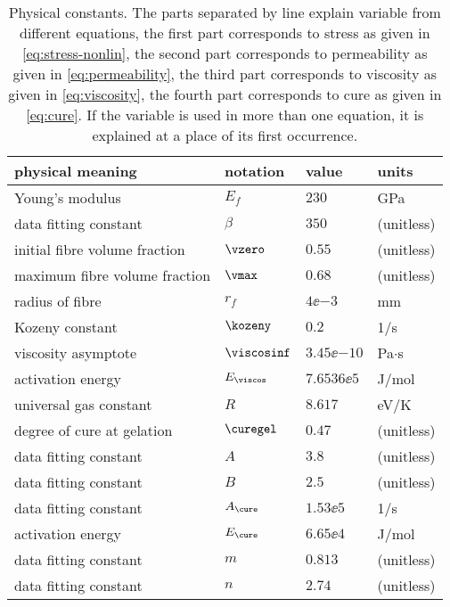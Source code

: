 \documentclass[twoside,a4paper,12pt]{article}
\newcommand{\note}[1]{}
\newcommand{\QM}{}
\begin{document}
\begin{table}[t]
  \centering
  \begin{tabular}{llll}
    \toprule
    physical meaning & notation & value & units \\
    \midrule
    Young's modulus               & $E_f$        & $230$         & GPa            \\ 
    data fitting constant         & $\beta$      & $350$         & (unitless)            \\
    initial fibre volume fraction & $\vzero$        & $0.55$        & (unitless)     \\
    maximum fibre volume fraction & $\vmax$        & $0.68$        & (unitless)     \\
    \midrule
    radius of fibre               & $r_f$        & $4\ee{-3}$    & mm             \\
    Kozeny constant              & $\kozeny$          & $0.2$         & 1/s \QM            \\
    \midrule
    viscosity asymptote     & $\viscosinf$ & $3.45\ee{-10}$ & Pa$\cdot$s \QM \\ 
    activation energy \note{of what?}    & $E_\viscos$ & $7.6536\ee{5}$& J/mol\\
    universal gas constant        & $R$          & $8.617$       & eV/K           \\
    degree of cure at  gelation   & $\curegel$   & $0.47$        & (unitless)            \\ 
    data fitting constant        &$A$ & $3.8$&(unitless)\\
    data fitting constant        &$B$ & $2.5$&(unitless)\\
    \midrule
     data fitting constant             &$A_\cure$&$1.53\ee{5}$& 1/s \\
     activation energy             &$E_\cure$& $6.65\ee{4}$  & J/mol          \\
     data fitting constant             &$m$&$0.813$& (unitless) \\
     data fitting constant             &$n$&$2.74$& (unitless) \\
    \bottomrule
  \end{tabular}
  \caption{Physical constants. The parts separated by line explain variable from different equations, the first part corresponds to stress as given in \eqref{eq:stress-nonlin}, the second part corresponds to permeability as given in \eqref{eq:permeability}, the third part corresponds to viscosity as given in \eqref{eq:viscosity}, the fourth part corresponds to cure as given in \eqref{eq:cure}. If the variable is used in more than one equation, it is explained at a place of its first occurrence.}
  \label{tab:phys-const}
\end{table}
\end{document}
